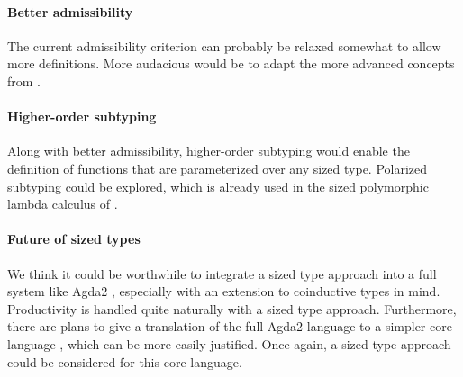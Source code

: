 \paragraph*{Better admissibility}
The current admissibility criterion can probably be relaxed somewhat to allow more definitions. 
More audacious would be to adapt the more advanced concepts from \cite{abel:PhD}.
\paragraph*{Higher-order subtyping}
Along with better admissibility, higher-order subtyping would enable the definition of functions that are parameterized over any sized type. Polarized subtyping \cite{steffen:phd} could be explored, which is already used in the sized polymorphic lambda calculus of \cite{abel:PhD}.
\paragraph*{Future of sized types}
We think it could be worthwhile to integrate a sized type approach into a full system like Agda2 \cite{norell:thesis}, especially with an extension to coinductive types in mind. Productivity is handled quite naturally with a sized type approach. 
Furthermore, there are plans to give a translation of the full Agda2 language to a simpler core language \cite{mini-tt}, which can be more easily justified. Once again, a sized type approach could be considered for this core language.

